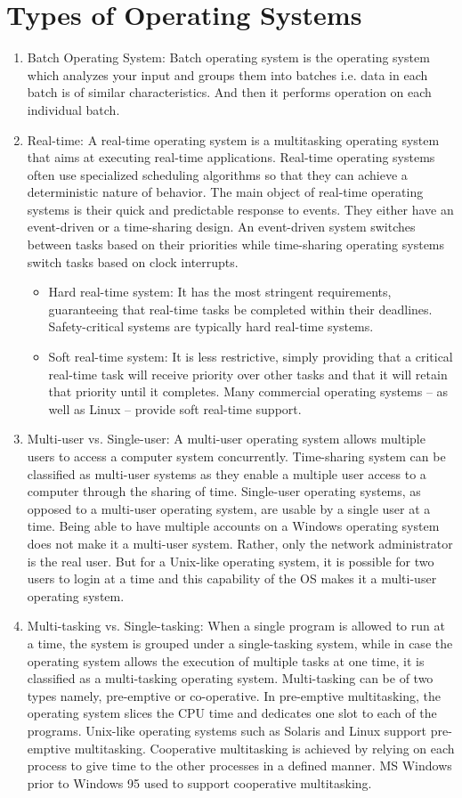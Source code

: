 \documentclass[11pt,a4paper]{article}
\begin{document}
	\section{Types of Operating Systems}
	\begin{enumerate}
	\item Batch Operating System:  Batch operating system is the operating system which analyzes your input and groups them into batches i.e. data in each batch is of similar characteristics. And then it performs operation on each individual batch.
	\item Real-time:  A real-time operating system is a multitasking operating system that aims at executing real-time applications. Real-time operating systems often use specialized scheduling algorithms so that they can achieve a deterministic nature of behavior. The main object of real-time operating systems is their quick and predictable response to events. They either have an event-driven or a time-sharing design. An event-driven system switches between tasks based on their priorities while time-sharing operating systems switch tasks based on clock interrupts.
	\begin{itemize}
		\item Hard real-time system:  It has the most stringent requirements, guaranteeing that real-time tasks be completed within their deadlines. Safety-critical systems are typically hard real-time systems.
		\item Soft real-time system:  It is less restrictive, simply providing that a critical real-time task will receive priority over other tasks and that it will retain that priority until it completes. Many commercial operating systems – as well as Linux – provide soft real-time support.
	\end{itemize}
	\item Multi-user vs. Single-user:  A multi-user operating system allows multiple users to access a computer system concurrently. Time-sharing system can be classified as multi-user systems as they enable a multiple user access to a computer through the sharing of time. Single-user operating systems, as opposed to a multi-user operating system, are usable by a single user at a time. Being able to have multiple accounts on a Windows operating system does not make it a multi-user system. Rather, only the network administrator is the real user. But for a Unix-like operating system, it is possible for two users to login at a time and this capability of the OS makes it a multi-user operating system.
	\item Multi-tasking vs. Single-tasking:  When a single program is allowed to run at a time, the system is grouped under a single-tasking system, while in case the operating system allows the execution of multiple tasks at one time, it is classified as a multi-tasking operating system. Multi-tasking can be of two types namely, pre-emptive or co-operative. In pre-emptive multitasking, the operating system slices the CPU time and dedicates one slot to each of the programs. Unix-like operating systems such as Solaris and Linux support pre-emptive multitasking. Cooperative multitasking is achieved by relying on each process to give time to the other processes in a defined manner. MS Windows prior to Windows 95 used to support cooperative multitasking.

\end{enumerate}
\end{document}

